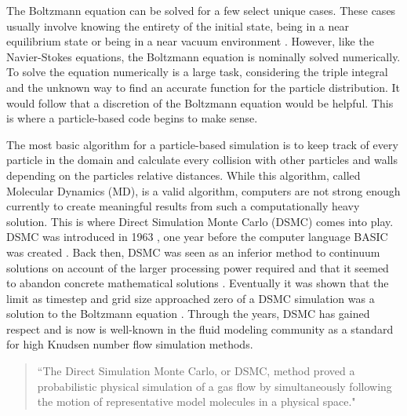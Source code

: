 \indent The Boltzmann equation can be solved for a few select unique cases. These cases usually involve knowing the entirety of the initial state, being in a near equilibrium state or being in a near vacuum environment \cite{boltzmann_solved}. However, like the Navier-Stokes equations, the Boltzmann equation is nominally solved numerically. To solve the equation numerically is a large task, considering the triple integral and the unknown way to find an accurate function for the particle distribution. It would follow that a discretion of the Boltzmann equation would be helpful. This is where a particle-based code begins to make sense. \par

\indent The most basic algorithm for a particle-based simulation is to keep track of every particle in the domain and calculate every collision with other particles and walls depending on the particles relative distances. While this algorithm, called Molecular Dynamics (MD), is a valid algorithm, computers are not strong enough currently to create meaningful results from such a computationally heavy solution. This is where Direct Simulation Monte Carlo (DSMC) comes into play. DSMC was introduced in 1963 \cite{dsmc_speed}, one year before the computer language BASIC was created \cite{basic}. Back then, DSMC was seen as an inferior method to continuum solutions on account of the larger processing power required and that it seemed to abandon concrete mathematical solutions \cite{dsmc_speed}. Eventually it was shown that the limit as timestep and grid size approached zero of a DSMC simulation was a solution to the Boltzmann equation \cite{bird_dsmc}. Through the years, DSMC has gained respect and is now is well-known in the fluid modeling community as a standard for high Knudsen number flow simulation methods.\par

\begin{quote}
    ``The Direct Simulation Monte Carlo, or DSMC, method proved a probabilistic physical simulation of a gas flow by simultaneously following the motion of representative model molecules in a physical space." \cite{bird_dsmc}
\end{quote}


